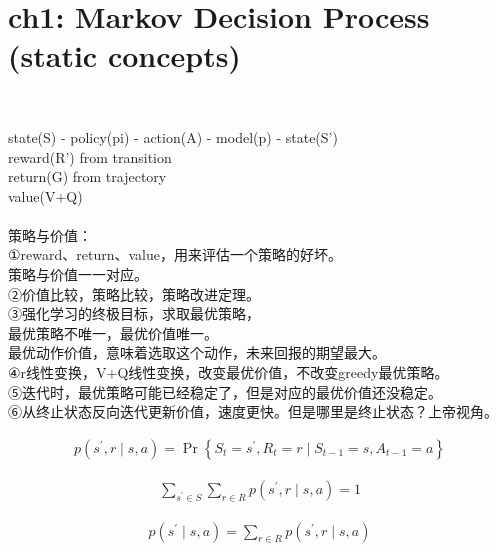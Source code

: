 \documentclass{article}
\begin{document}
\section*{ch1: Markov Decision Process (static concepts)}


~ \\[3pt]  %
\begin{CJK}{UTF8}{gbsn}
    state(S) - policy(pi) - action(A) - model(p) - state(S') \\[3pt]
    reward(R') from transition \\[3pt]
    return(G) from trajectory \\[3pt]
    value(V+Q) \\[3pt]

    ~ \\[3pt]
    策略与价值：\\[3pt]
    ①reward、return、value，用来评估一个策略的好坏。 \\[3pt]
    策略与价值一一对应。 \\[3pt]
    ②价值比较，策略比较，策略改进定理。 \\[3pt]
    ③强化学习的终极目标，求取最优策略， \\[3pt]
    最优策略不唯一，最优价值唯一。 \\[3pt]
    最优动作价值，意味着选取这个动作，未来回报的期望最大。 \\[3pt]
    ④r线性变换，V+Q线性变换，改变最优价值，不改变greedy最优策略。 \\[3pt]
    ⑤迭代时，最优策略可能已经稳定了，但是对应的最优价值还没稳定。 \\[3pt]
    ⑥从终止状态反向迭代更新价值，速度更快。但是哪里是终止状态？上帝视角。 \\[3pt]
\end{CJK}


\begin{align*}
    p \left( s^{\prime}, r \mid s, a \right) 
    = \operatorname{Pr} \left\{ S_{t}=s^{\prime}, R_{t}=r \mid 
    S_{t-1}=s, A_{t-1}=a \right\} 
\end{align*}

\begin{align*}
    \sum_{s^{\prime} \in S} \sum_{r \in R} 
    p \left( s^{\prime}, r \mid s, a \right) = 1 
\end{align*}

\begin{align*}
    p \left( s^{\prime} \mid s, a \right) 
    = \sum_{r \in R} p \left( s^{\prime}, r \mid s, a \right) 
\end{align*}
\end{document}
